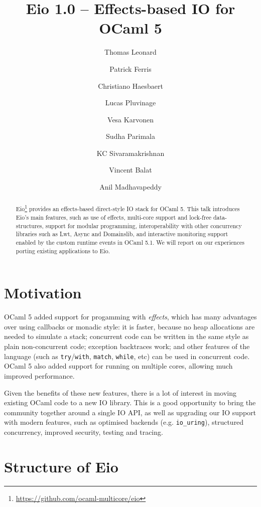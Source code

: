 \documentclass[a4paper,twocolumn]{article}
\begin{document}
\title{Eio 1.0 -- Effects-based IO for OCaml 5}
\author{Thomas Leonard\and
        Patrick Ferris\and
        Christiano Haesbaert\and
        Lucas Pluvinage\and
        Vesa Karvonen\and
        Sudha Parimala\and
        KC Sivaramakrishnan\and
	Vincent Balat\and
        Anil Madhavapeddy}
\maketitle

\begin{abstract}

Eio\footnote{\url{https://github.com/ocaml-multicore/eio}} provides an effects-based direct-style IO stack for OCaml 5. This talk introduces Eio's main features, such as use of effects, multi-core support and lock-free data-structures, support for modular programming, interoperability with other concurrency libraries such as Lwt, Async and Domainslib, and interactive monitoring support enabled by the custom runtime events in OCaml 5.1.
We will report on our experiences porting existing applications to Eio.

\end{abstract}

\section*{Motivation}

OCaml 5 added support for progamming with \emph{effects}, which has many advantages over using callbacks or monadic style: it is faster, because no heap allocations are needed to simulate a stack; concurrent code can be written in the same style as plain non-concurrent code; exception backtraces work; and other features of the language (such as {\tt try}/{\tt with}, {\tt match}, {\tt while}, etc) can be used in concurrent code.
OCaml 5 also added support for running on multiple cores, allowing much improved performance.

Given the benefits of these new features, there is a lot of interest in moving existing OCaml code to a new IO library.
This is a good opportunity to bring the community together around a single IO API, as well as upgrading our IO support with modern features, such as optimised backends (e.g. \verb|io_uring|), structured concurrency, improved security, testing and tracing.

\section*{Structure of Eio}
\end{document}
